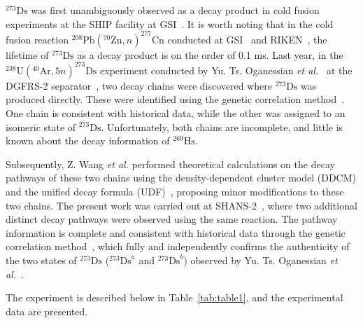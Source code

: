\documentclass[aps,prc,reprint,superscriptaddress]{revtex4-2}
\begin{document}
$^{273}\text{Ds}$ was first unambiguously observed as a decay product in cold fusion experiments at the SHIP facility at GSI~\cite{Hofmann1996}. It is worth noting that in the cold fusion reaction $^{208}\text{Pb}(^{70}\text{Zn},n)^{277}\text{Cn}$ conducted at GSI~\cite{Hofmann1996, Hofmann2002} and RIKEN~\cite{Morita2007, Sumita2013}, the lifetime of $^{273}\text{Ds}$ as a decay product is on the order of 0.1 ms. Last year, in the $^{238}\text{U}(^{40}\text{Ar}, 5n)^{273}\text{Ds}$ experiment conducted by Yu. Ts. Oganessian \textit{et al.}~\cite{Oganessian2024} at the DGFRS-2 separator~\cite{Oganessian2022}, two decay chains were discovered where $^{273}\text{Ds}$ was produced directly. These were identified using the genetic correlation method~\cite{Hofmann2018}. One chain is consistent with historical data, while the other was assigned to an isomeric state of $^{273}\text{Ds}$. Unfortunately, both chains are incomplete, and little is known about the decay information of $^{269}\text{Hs}$.

Subsequently, Z. Wang \textit{et al.} performed theoretical calculations on the decay pathways of these two chains using the density-dependent cluster model (DDCM) and the unified decay formula (UDF)~\cite{Wang2024}, proposing minor modifications to these two chains. The present work was carried out at SHANS-2~\cite{Sheng2021}, where two additional distinct decay pathways were observed using the same reaction. The pathway information is complete and consistent with historical data through the genetic correlation method~\cite{Hofmann2018}, which fully and independently confirms the authenticity of the two states of $^{273}\text{Ds}$ ($^{273}\text{Ds}^{a}$ and $^{273}\text{Ds}^{b}$) observed by Yu. Ts. Oganessian \textit{et al.}~\cite{Oganessian2024}.

The experiment is described below in Table~\ref{tab:table1}, and the experimental data are presented.
\end{document}
